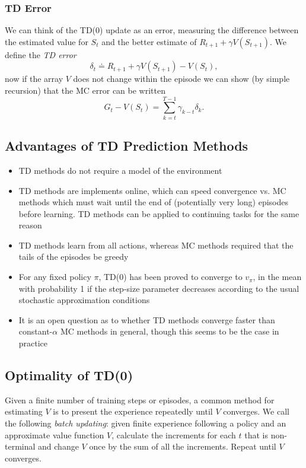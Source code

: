 \subsubsection*{TD Error}
We can think of the TD(0) update as an error, measuring the difference between the estimated value for $S_t$ and the better estimate of $R_{t+1} + \gamma V(S_{t+1})$. We define the \emph{TD error}
\begin{equation}
    \delta_t \doteq R_{t+1} + \gamma V(S_{t+1}) - V(S_t),
\end{equation}
now if the array $V$ does not change within the episode we can show (by simple recursion) that the MC error can be written
\begin{equation}
    G_t - V(S_t) = \sum_{k=t}^{T-1} \gamma_{k-t}\delta_k.
\end{equation}

\subsection{Advantages of TD Prediction Methods}
\begin{itemize}
    \item TD methods do not require a model of the environment
    \item TD methods are implements online, which can speed convergence vs. MC methods which must wait until the end of (potentially very long) episodes before learning. TD methods can be applied to continuing tasks for the same reason
    \item TD methods learn from all actions, whereas MC methods required that the tails of the episodes be greedy
    \item For any fixed policy $\pi$, TD(0) has been proved to converge to $v_\pi$, in the mean with probability 1 if the step-size parameter decreases according to the usual stochastic approximation conditions
    \item It is an open question as to whether TD methods converge faster than constant-$\alpha$ MC methods in general, though this seems to be the case in practice
\end{itemize}

\subsection{Optimality of TD(0)}
Given a finite number of training steps or episodes, a common method for estimating $V$ is to present the experience repeatedly until $V$ converges. We call the following \emph{batch updating}: given finite experience following a policy and an approximate value function $V$, calculate the increments for each $t$ that is non-terminal and change $V$ once by the sum of all the increments. Repeat until $V$ converges.\\

